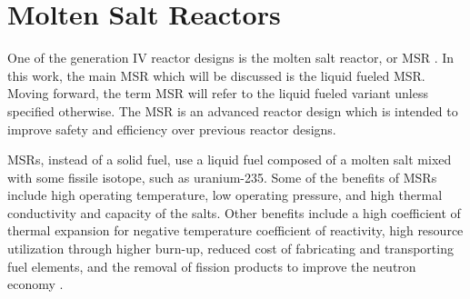 
\section{Molten Salt Reactors}

One of the generation IV reactor designs is the molten salt reactor, or MSR \cite{kelly_generation_2014}.
In this work, the main MSR which will be discussed is the liquid fueled MSR. Moving forward, the term MSR will refer to the liquid fueled variant unless specified otherwise.
The MSR is an advanced reactor design which is intended to improve safety and efficiency over previous reactor designs.




MSRs, instead of a solid fuel, use a liquid fuel composed of a molten salt mixed with some fissile isotope, such as uranium-235. Some of the benefits of MSRs include high operating temperature, low operating pressure, and high thermal conductivity and capacity of the salts. Other benefits include a high coefficient of thermal expansion for negative temperature coefficient of reactivity, high resource utilization through higher burn-up, reduced cost of fabricating and transporting fuel elements, and the removal of fission products to improve the neutron economy \cite{serp_molten_2014}.

